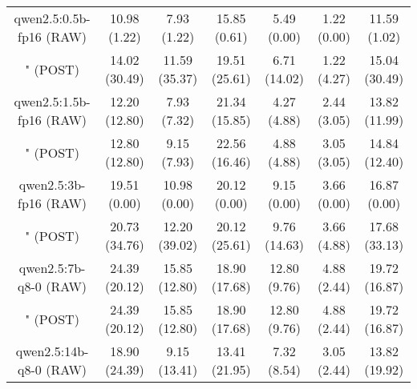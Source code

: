 \begin{table}[]
{\begin{tabular}{ccccccc}
        \multicolumn{1}{c|}{qwen2.5:0.5b-fp16 (RAW)} & 10.98 (1.22) & 7.93 (1.22) & \multicolumn{1}{c|}{15.85 (0.61)} & 5.49 (0.00) & \multicolumn{1}{c|}{1.22 (0.00)} & 11.59 (1.02) \\
        
        

        \multicolumn{1}{c|}{" (POST)} & 14.02 (30.49) & 11.59 (35.37) & \multicolumn{1}{c|}{19.51 (25.61)} & 6.71 (14.02) & \multicolumn{1}{c|}{1.22 (4.27)} & 15.04 (30.49) \\
        \cline{1-7}
        

        \multicolumn{1}{c|}{qwen2.5:1.5b-fp16 (RAW)} & 12.20 (12.80) & 7.93 (7.32) & \multicolumn{1}{c|}{21.34 (15.85)} & 4.27 (4.88) & \multicolumn{1}{c|}{2.44 (3.05)} & 13.82 (11.99) \\
        
        

        \multicolumn{1}{c|}{" (POST)} & 12.80 (12.80) & 9.15 (7.93) & \multicolumn{1}{c|}{22.56 (16.46)} & 4.88 (4.88) & \multicolumn{1}{c|}{3.05 (3.05)} & 14.84 (12.40) \\
        \cline{1-7}
        

        \multicolumn{1}{c|}{qwen2.5:3b-fp16 (RAW)} & 19.51 (0.00) & 10.98 (0.00) & \multicolumn{1}{c|}{20.12 (0.00)} & 9.15 (0.00) & \multicolumn{1}{c|}{3.66 (0.00)} & 16.87 (0.00) \\
        
        

        \multicolumn{1}{c|}{" (POST)} & 20.73 (34.76) & 12.20 (39.02) & \multicolumn{1}{c|}{20.12 (25.61)} & 9.76 (14.63) & \multicolumn{1}{c|}{3.66 (4.88)} & 17.68 (33.13) \\
        \cline{1-7}
        

        \multicolumn{1}{c|}{qwen2.5:7b-q8-0 (RAW)} & 24.39 (20.12) & 15.85 (12.80) & \multicolumn{1}{c|}{18.90 (17.68)} & 12.80 (9.76) & \multicolumn{1}{c|}{4.88 (2.44)} & 19.72 (16.87) \\
        
        

        \multicolumn{1}{c|}{" (POST)} & 24.39 (20.12) & 15.85 (12.80) & \multicolumn{1}{c|}{18.90 (17.68)} & 12.80 (9.76) & \multicolumn{1}{c|}{4.88 (2.44)} & 19.72 (16.87) \\
        \cline{1-7}
        

        \multicolumn{1}{c|}{qwen2.5:14b-q8-0 (RAW)} & 18.90 (24.39) & 9.15 (13.41) & \multicolumn{1}{c|}{13.41 (21.95)} & 7.32 (8.54) & \multicolumn{1}{c|}{3.05 (2.44)} & 13.82 (19.92) \\
        

\end{tabular}}
\end{table}
